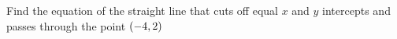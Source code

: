 
%
%
%
%      
% 
% 
%   



\gcalcexpr[0]{\vbthree}{\vbone + \vbtwo}

\question Find the equation of the straight line that cuts off equal $x$ and $y$ intercepts 
and passes through the point $(-4, 2)$

\insertQR{}

\watchout

\ifprintanswers
\fi 

